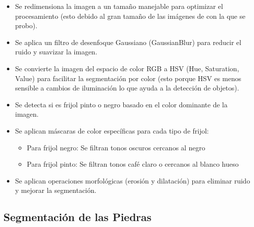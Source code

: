 \documentclass[conference]{IEEEtran}
\begin{document}
    \begin{itemize}
        \item Se redimensiona la imagen a un tamaño manejable para optimizar el procesamiento (esto debido al gran tamaño de las imágenes de con la que se probo).
        \item Se aplica un filtro de desenfoque Gaussiano (GaussianBlur) para reducir el ruido y suavizar la imagen\cite{gaussianblur}.
        \item Se convierte la imagen del espacio de color RGB a HSV\cite{rgbhsv} (Hue, Saturation, Value) para facilitar la segmentación por color (esto porque HSV es menos sensible a cambios de iluminación lo que ayuda a la detección de objetos).
        \item Se detecta si es frijol pinto o negro basado en el color dominante de la imagen.
        \item Se aplican máscaras de color específicas para cada tipo de frijol:
        \begin{itemize}
            \item Para frijol negro: Se filtran tonos oscuros cercanos al negro
            \item Para frijol pinto: Se filtran tonos café claro o cercanos al blanco hueso 
        \end{itemize}
        \item Se aplican operaciones morfológicas (erosión y dilatación) para eliminar ruido y mejorar la segmentación\cite{morfologico}.
    \end{itemize}

    \subsection{Segmentación de las Piedras}
    
\end{document}
